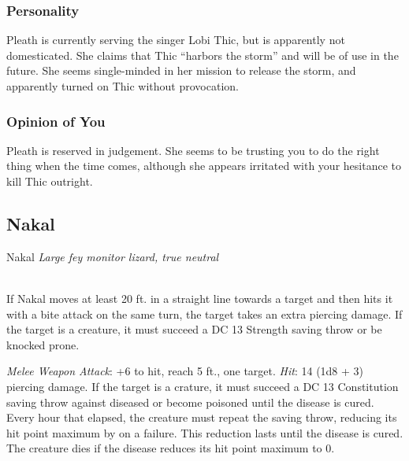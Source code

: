 \documentclass[letterpaper,10pt,twoside,twocolumn,openany]{book}
\begin{document}
\subsubsection{Personality}
Pleath is currently serving the singer Lobi Thic, but is apparently not domesticated. 
She claims that Thic ``harbors the storm'' and will be of use in the future.
She seems single-minded in her mission to release the storm, and apparently turned on Thic without provocation. 

\subsubsection{Opinion of You}
Pleath is reserved in judgement. 
She seems to be trusting you to do the right thing when the time comes, although she appears irritated with your hesitance to kill Thic outright.


\subsection{ Nakal}

\begin{monsterbox}{ Nakal}
	\textit{Large fey monitor lizard, true neutral}\\
	\hline%
	\basics[%
	armorclass = 12 (natural armor),
	hitpoints  = \dice{6d8 + 12},
	speed      = {35 ft.}
	]
	\hline%
	\stats[
    STR = \stat{17}, %
    DEX = \stat{11},
    CON = \stat{16},
    INT = \stat{5},
    WIS = \stat{13},
    CHA = \stat{5}
	]
	\hline%
	\details[%
	skills = {Athletics + 3},
	senses = {pp 11},
	languages = {Monitor Lizard, understands Common and Sylvan but cannot speak},
	challenge = 1
	]
	\hline \\[1mm]
	\begin{monsteraction}[Charge]
		If Nakal moves at least 20 ft. in a straight line towards a target and then hits it with a bite attack on the same turn, the target takes an extra  piercing damage.
		If the target is a creature, it must succeed a DC 13 Strength saving throw or be knocked prone.
	\end{monsteraction}
	
	\begin{monsteraction}[Bite]
		\emph{Melee Weapon Attack}: +6 to hit, reach 5 ft., one target. \emph{Hit}: 14 (1d8 + 3) piercing damage.
		If the target is a crature, it must succeed a DC 13 Constitution saving throw against diseased or become poisoned until the disease is cured.  
		Every hour that elapsed, the creature must repeat the saving throw, reducing its hit point maximum by  on a failure. 
		This reduction lasts until the disease is cured. 
		The creature dies if the disease reduces its hit point maximum to 0.
	\end{monsteraction}
	
\end{monsterbox}
\end{document}

